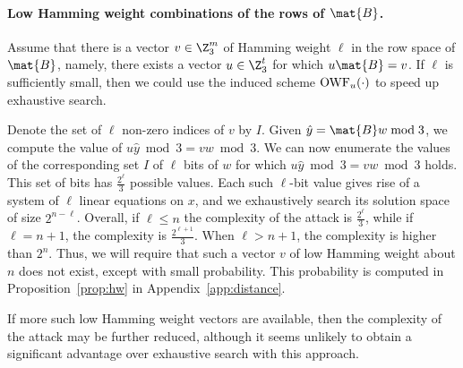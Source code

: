 \paragraph{Low Hamming weight combinations of the rows of $\mat{B}$.}
Assume that there is a vector $v \in \Z_3^m$ of Hamming weight $\ell$ in the row space of $\mat{B}$, namely, there exists a vector $u \in \Z_3^t$ for which $u \mat{B} = v$. If $\ell$ is sufficiently small, then we could use the induced scheme $\textnormal{OWF}_u(\cdot)$ to speed up exhaustive search.

Denote the set of $\ell$ non-zero indices of $v$ by $I$. Given $\hat{y} = \mat{B}w \bmod 3$, we compute the value of $u\hat{y} \bmod 3 = vw \bmod 3$. We can now enumerate the values of the corresponding set $I$ of $\ell$ bits of $w$ for which $u\hat{y} \bmod 3 = vw \bmod 3$ holds. This set of bits has $\tfrac{2^\ell}{3}$ possible values. Each such $\ell$-bit value gives rise of a system of $\ell$ linear equations on $x$, and we exhaustively search its solution space of size $2^{n-\ell}$. Overall, if $\ell \leq n$ the complexity of the attack is
$\tfrac{2^{\ell}}{3}$, while if $\ell = n+1$, the complexity is $\tfrac{2^{\ell+1}}{3}$. When $\ell > n+1$, the complexity is higher than $2^n$.
Thus, we will require that such a vector $v$ of low Hamming weight about $n$ does not exist, except with small probability.
This probability is computed in Proposition~\ref{prop:hw} in Appendix~\ref{app:distance}.

If more such low Hamming weight vectors are available, then the complexity of the attack may be further reduced,
although it seems unlikely to obtain a significant advantage over exhaustive search with this approach.








